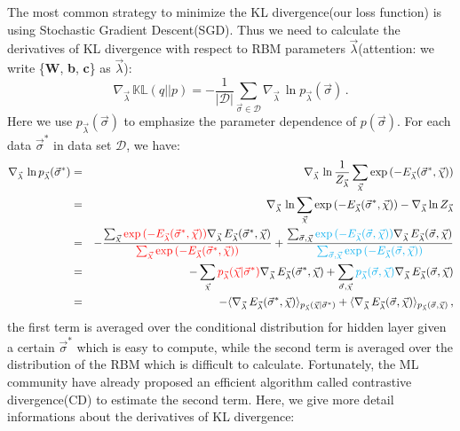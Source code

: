 \documentclass[letterpaper, 10pt]{article}
\newcommand{\qbar}{\rangle}
\newcommand{\qket}{\langle}
\begin{document}
The most common strategy to minimize the KL divergence(our loss function) is using Stochastic Gradient Descent(SGD). Thus we need to calculate the derivatives of KL divergence with respect to RBM parameters $\vec{\lambda}$(attention: we write \{\textbf{W}, \textbf{b}, \textbf{c}\} as $\vec{\lambda}$):
\begin{equation}
\nabla_{\vec{\lambda}} \, \mathbb{KL}(q||p) = - \frac{1}{|\mathcal{D}|} \sum_{\vec{\sigma} \in \mathcal{D}} \nabla_{\vec{\lambda}} \, \ln{p_{\vec{\lambda}}(\vec{\sigma})}\,.\label{eq:eq10}
\end{equation}
Here we use $p_{\vec{\lambda}}(\vec{\sigma})$ to emphasize the parameter dependence of $p(\vec{\sigma})$. For each data $\vec{\sigma}^*$ in data set $\mathcal{D}$, we have:
\begin{eqnarray*}
\nabla_{\vec{\lambda}} \, \ln{p_{\vec{\lambda}}(\vec{\sigma}^*)} & = & \nabla_{\vec{\lambda}} \, \ln \frac{1}{Z_{\vec{\lambda}}} \sum_{\vec{\chi}} \exp{( - E_{\vec{\lambda}}(\vec{\sigma}^*,\vec{\chi}) )} \\
	& = & \nabla_{\vec{\lambda}} \, \ln \sum_{\vec{\chi}} \exp{( - E_{\vec{\lambda}}(\vec{\sigma}^*,\vec{\chi}) )} - \nabla_{\vec{\lambda}} \ln Z_{\vec{\lambda}} \\
	& = & - \frac{\sum_{\vec{\chi}} {\color{red}{\exp{( - E_{\vec{\lambda}}(\vec{\sigma}^*,\vec{\chi}) )}}} \nabla_{\vec{\lambda}} \, E_{\vec{\lambda}}(\vec{\sigma}^*,\vec{\chi})}{ {\color{red}{\sum_{\vec{\chi}} \exp{( - E_{\vec{\lambda}}(\vec{\sigma}^*,\vec{\chi}) )}}} } + \frac{\sum_{\vec{\sigma},\vec{\chi}} {\color{cyan}{\exp{(-E_{\vec{\lambda}}(\vec{\sigma},\vec{\chi}))}}} \nabla_{\vec{\lambda}} \, E_{\vec{\lambda}}(\vec{\sigma},\vec{\chi})}{ {\color{cyan}{\sum_{\vec{\sigma},\vec{\chi}} \exp{(-E_{\vec{\lambda}}(\vec{\sigma},\vec{\chi}))}}} } \\
	& = & - \sum_{\vec{\chi}} {\color{red}{p_{\vec{\lambda}}(\vec{\chi} | \vec{\sigma}^*)}} \nabla_{\vec{\lambda}} \, E_{\vec{\lambda}}(\vec{\sigma}^*,\vec{\chi}) + \sum_{\vec{\sigma},\vec{\chi}} {\color{cyan}{p_{\vec{\lambda}}(\vec{\sigma},\vec{\chi})}} \nabla_{\vec{\lambda}} \, E_{\vec{\lambda}}(\vec{\sigma},\vec{\chi}) \\
	& = & - \qket \nabla_{\vec{\lambda}} \, E_{\vec{\lambda}}(\vec{\sigma}^*,\vec{\chi})\qbar_{p_{\vec{\lambda}}(\vec{\chi} | \vec{\sigma}^*)} + \qket\nabla_{\vec{\lambda}} \, E_{\vec{\lambda}}(\vec{\sigma},\vec{\chi})\qbar_{p_{\vec{\lambda}}(\vec{\sigma},\vec{\chi})}\,,
\end{eqnarray*}
the first term is averaged over the conditional distribution for hidden layer given a certain $\vec{\sigma}^*$ which is easy to compute, while the second term is averaged over the distribution of the RBM which is difficult to calculate. Fortunately, the ML community have already proposed an efficient algorithm called contrastive divergence(CD) to estimate the second term. Here, we give more detail informations about the derivatives of KL divergence:
\end{document}
